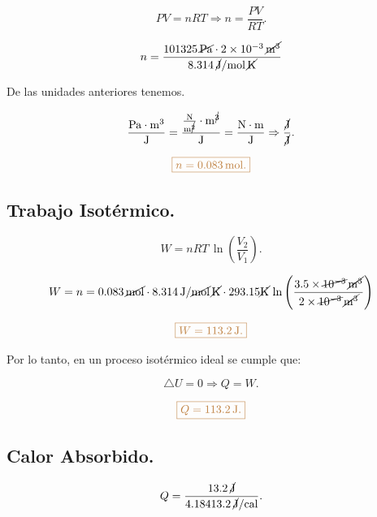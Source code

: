 \documentclass[a4paper,12pt]{article} %
\begin{document}
\[ PV = nRT \Rightarrow n = \frac{PV}{RT}. \]

\vspace{\baselineskip}

\[ n = \frac{101325 \, \cancel{\mathrm{Pa}} \cdot 2 \times 10^{-3} \, \cancel{\mathrm{m}^3} }{8.314 \, \cancel{\mathrm{J}} / \mathrm{mol} \, \cancel{\mathrm{K}} } \]

\vspace{\baselineskip}

\begin{justify}
	De las unidades anteriores tenemos.
\end{justify}

\[ \frac{\mathrm{Pa} \cdot \mathrm{m}^3}{\mathrm{J}} = \frac{\frac{\mathrm{N}}{\mathrm{m}^{\cancel{2}}} \cdot \mathrm{m}^{\cancel{3}}}{ \mathrm{J}} = \frac{\mathrm{N} \cdot \mathrm{m}}{ \mathrm{J}} \Rightarrow \frac{\cancel{\mathrm{J}}}{\cancel{\mathrm{J}}}. \]

\vspace{\baselineskip}

\[ \textcolor{brown}{\boxed{ n = 0.083 \, \mathrm{mol}. }}\]

\subsection{Trabajo Isotérmico.}

\[ W  = nRT \, \ln(\frac{V_2}{V_1}). \]

\[ W = n = 0.083 \, \cancel{\mathrm{mol}} \cdot 8.314 \, \mathrm{J} / \cancel{\mathrm{mol}} \, \cancel{\mathrm{K}} \cdot 293.15 \cancel{\mathrm{K}} \, \ln\left( \frac{3.5 \times \cancel{10^{-3}} \, \cancel{\mathrm{m}^3}}{ 2 \times \cancel{10^{-3}} \, \cancel{\mathrm{m}^3}} \right) \]

\[\textcolor{brown}{\boxed{ W = 113.2 \, \mathrm{J}. }}  \]

\begin{justify}
	Por lo tanto, en un proceso isotérmico ideal se cumple que:
\end{justify}

\[ \triangle U = 0 \Rightarrow Q = W. \]

\[\textcolor{brown}{\boxed{ Q = 113.2 \, \mathrm{J}. }}  \]

\subsection{Calor Absorbido.}

\[ Q = \frac{13.2 \, \cancel{\mathrm{J}}}{4.184 13.2 \, \cancel{\mathrm{J}} / \mathrm{cal}}. \]
\end{document}
